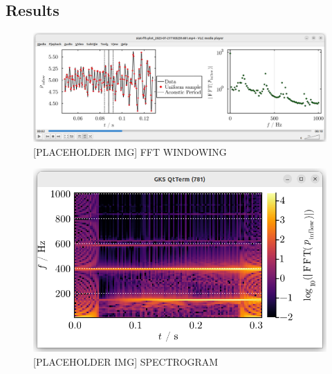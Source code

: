 



\subsection{Results}








\begin{figure}[t]
\centering
\includegraphics[scale=0.35]{assets/graphs/fft-windowing.png}
\caption{[PLACEHOLDER IMG] FFT WINDOWING}
\label{fig:windowing}
\end{figure}

\begin{figure}[t]
\centering
\includegraphics[scale=0.35]{assets/graphs/spectrogram.png}
\caption{[PLACEHOLDER IMG] SPECTROGRAM}
\label{fig:spectrogram}
\end{figure}

